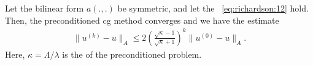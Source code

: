\begin{theorem}
  Let the bilinear form $a(.,.)$ be symmetric, and let the
  ~\eqref{eq:richardson:12} hold. Then,
  the preconditioned cg method converges and we have the estimate
  \begin{gather}
    \label{eq:cg:1}
    \|u^{(k)} - u\|_A \le 2
    \left(\frac{\sqrt\kappa-1}{\sqrt\kappa+1}\right)^k \|u^{(0)} - u\|_A.
  \end{gather}
  Here, $\kappa = \Lambda/\lambda$ is the  of the preconditioned problem.
\end{theorem}

